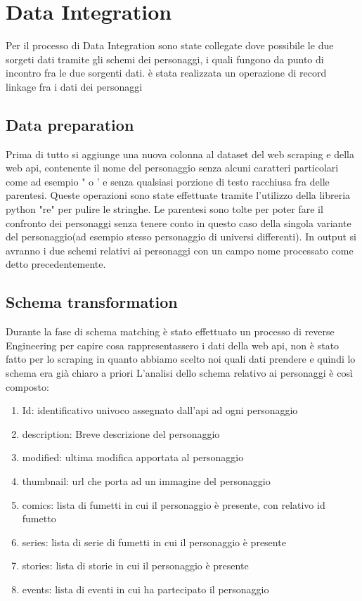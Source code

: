 \documentclass[
12pt, %
a4paper, %
oneside, %
headinclude,footinclude, %
BCOR5mm, %
]{scrartcl}
\begin{document}
\section{Data Integration}
Per il processo di Data Integration sono state collegate dove possibile le due sorgeti dati tramite gli schemi dei personaggi, i quali fungono da punto di incontro fra le due sorgenti dati. è stata realizzata un operazione di record linkage fra i dati dei personaggi
\subsection{Data preparation}
Prima di tutto si aggiunge una nuova colonna al dataset del web scraping e della web api, contenente il nome del personaggio senza alcuni caratteri particolari come ad esempio " o ' e senza qualsiasi porzione di testo racchiusa fra delle parentesi. Queste operazioni sono state effettuate tramite l'utilizzo della libreria python "re" per pulire le stringhe. Le parentesi sono tolte per poter fare il confronto dei personaggi senza tenere conto in questo caso della singola variante del personaggio(ad esempio stesso personaggio di universi differenti). In output si avranno i due schemi relativi ai personaggi con un campo nome processato come detto precedentemente.
\subsection{Schema transformation}
Durante la fase di schema matching è stato effettuato un processo di reverse Engineering per capire cosa rappresentassero i dati della web api, non è stato fatto per lo scraping in quanto abbiamo scelto noi quali dati prendere e quindi lo schema era già chiaro a priori
L'analisi dello schema relativo ai personaggi è così composto:

\begin{enumerate}
	\item Id: identificativo univoco assegnato dall'api ad ogni personaggio
	\item description: Breve descrizione del personaggio
	\item modified: ultima modifica apportata al personaggio
	\item thumbnail: url che porta ad un immagine del personaggio
	\item comics: lista di fumetti in cui il personaggio è presente, con relativo id fumetto
	\item series: lista di serie di fumetti in cui il personaggio è presente
	\item stories: lista di storie in cui il personaggio è presente
	\item events: lista di eventi in cui ha partecipato il personaggio
	
\end{enumerate}
\end{document}
